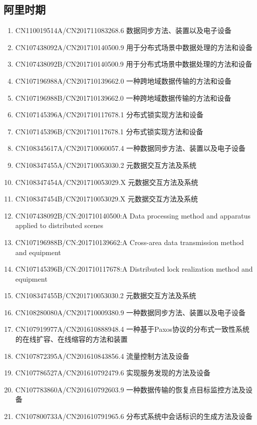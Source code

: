 \documentclass[scheme=plain]{ctexart}
\begin{document}
\subsection*{阿里时期}

\begin{enumerate}
    \item CN110019514A/CN201711083268.6 数据同步方法、装置以及电子设备
    \item CN107438092A/CN201710140500.9 用于分布式场景中数据处理的方法和设备
    \item CN107438092B/CN201710140500.9 用于分布式场景中数据处理的方法和设备
    \item CN107196988A/CN201710139662.0 一种跨地域数据传输的方法和设备
    \item CN107196988B/CN201710139662.0 一种跨地域数据传输的方法和设备
    \item CN107145396A/CN201710117678.1 分布式锁实现方法和设备
    \item CN107145396B/CN201710117678.1 分布式锁实现方法和设备
    \item CN108345617A/CN201710060057.4 一种数据同步方法、装置以及电子设备
    \item CN108347455A/CN201710053030.2 元数据交互方法及系统
    \item CN108347454A/CN201710053029.X 元数据交互方法及系统
    \item CN108347454B/CN201710053029.X 元数据交互方法及系统
    \item CN107438092B/CN:201710140500:A Data processing method and apparatus applied to distributed scenes
    \item CN107196988B/CN:201710139662:A Cross-area data transmission method and equipment
    \item CN107145396B/CN:201710117678:A Distributed lock realization method and equipment
    \item CN108347455B/CN201710053030.2 元数据交互方法及系统
    \item CN108280080A/CN201710009380.9 一种数据同步方法、装置以及电子设备
    \item CN107919977A/CN201610888948.4 一种基于Paxos协议的分布式一致性系统的在线扩容、在线缩容的方法和装置
    \item CN107872395A/CN201610843856.4 流量控制方法及设备
    \item CN107786527A/CN201610792479.6 实现服务发现的方法及设备
    \item CN107783860A/CN201610792603.9 一种数据传输的恢复点目标监控方法及设备
    \item CN107800733A/CN201610791965.6 分布式系统中会话标识的生成方法及设备

\end{enumerate}
\end{document}
